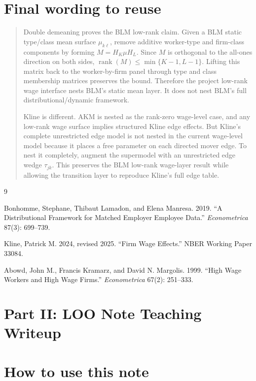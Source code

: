 \documentclass[11pt]{article}
\newcommand{\rank}{\operatorname{rank}}
\begin{document}
\section{Final wording to reuse}

\begin{quote}
Double demeaning proves the BLM low-rank claim. Given a BLM static type/class
mean surface \(\mu_{k\ell}\), remove additive worker-type and firm-class
components by forming \(M=H_K\mu H_L\). Since \(M\) is orthogonal to the all-ones
direction on both sides, \(\rank(M)\leq \min\{K-1,L-1\}\). Lifting this matrix
back to the worker-by-firm panel through type and class membership matrices
preserves the bound. Therefore the project low-rank wage interface nests BLM's
static mean layer. It does not nest BLM's full distributional/dynamic framework.

Kline is different. AKM is nested as the rank-zero wage-level case, and any
low-rank wage surface implies structured Kline edge effects. But Kline's
complete unrestricted edge model is not nested in the current wage-level model
because it places a free parameter on each directed mover edge. To nest it
completely, augment the supermodel with an unrestricted edge wedge
\(\tau_{jk}\). This preserves the BLM low-rank wage-layer result while allowing
the transition layer to reproduce Kline's full edge table.
\end{quote}

\begin{thebibliography}{9}

Bonhomme, Stephane, Thibaut Lamadon, and Elena Manresa. 2019. ``A
Distributional Framework for Matched Employer Employee Data.''
\emph{Econometrica} 87(3): 699--739.

Kline, Patrick M. 2024, revised 2025. ``Firm Wage Effects.'' NBER Working Paper
33084.

Abowd, John M., Francis Kramarz, and David N. Margolis. 1999. ``High Wage
Workers and High Wage Firms.'' \emph{Econometrica} 67(2): 251--333.

\end{thebibliography}




\clearpage
\section*{Part II: LOO Note Teaching Writeup}

\section*{How to use this note}
\end{document}
